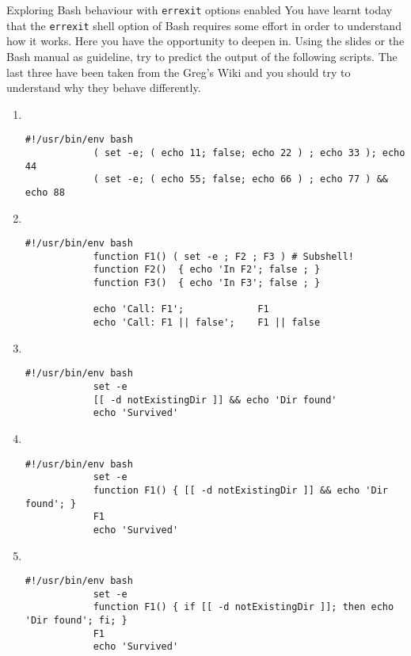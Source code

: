 
\begin{exercise}[Instructive]{Exploring Bash behaviour with \texttt{errexit} options enabled}
    You have learnt today that the \texttt{errexit} shell option of Bash requires some effort in order to understand how it works.
    Here you have the opportunity to deepen in.
    Using the slides or the Bash manual as guideline, try to predict the output of the following scripts.
    The last three have been taken from the Greg's Wiki and you should try to understand why they behave differently.
    \begin{enumerate}
        \item ~
        \begin{lstlisting}[style=myBash, numbers=none, aboveskip=0mm]
            #!/usr/bin/env bash
            ( set -e; ( echo 11; false; echo 22 ) ; echo 33 ); echo 44
            ( set -e; ( echo 55; false; echo 66 ) ; echo 77 ) && echo 88
        \end{lstlisting}
        \item ~
        \begin{lstlisting}[style=myBash, numbers=none, aboveskip=0mm]
            #!/usr/bin/env bash
            function F1() ( set -e ; F2 ; F3 ) # Subshell!
            function F2()  { echo 'In F2'; false ; }
            function F3()  { echo 'In F3'; false ; }

            echo 'Call: F1';             F1
            echo 'Call: F1 || false';    F1 || false
        \end{lstlisting}
        \item ~
        \begin{lstlisting}[style=myBash, numbers=none, aboveskip=0mm]
            #!/usr/bin/env bash
            set -e
            [[ -d notExistingDir ]] && echo 'Dir found'
            echo 'Survived'
        \end{lstlisting}
        \item ~
        \begin{lstlisting}[style=myBash, numbers=none, aboveskip=0mm]
            #!/usr/bin/env bash
            set -e
            function F1() { [[ -d notExistingDir ]] && echo 'Dir found'; }
            F1
            echo 'Survived'
        \end{lstlisting}
        \item ~
        \begin{lstlisting}[style=myBash, numbers=none, aboveskip=0mm]
            #!/usr/bin/env bash
            set -e
            function F1() { if [[ -d notExistingDir ]]; then echo 'Dir found'; fi; }
            F1
            echo 'Survived'
        \end{lstlisting}
    \end{enumerate}
\end{exercise}